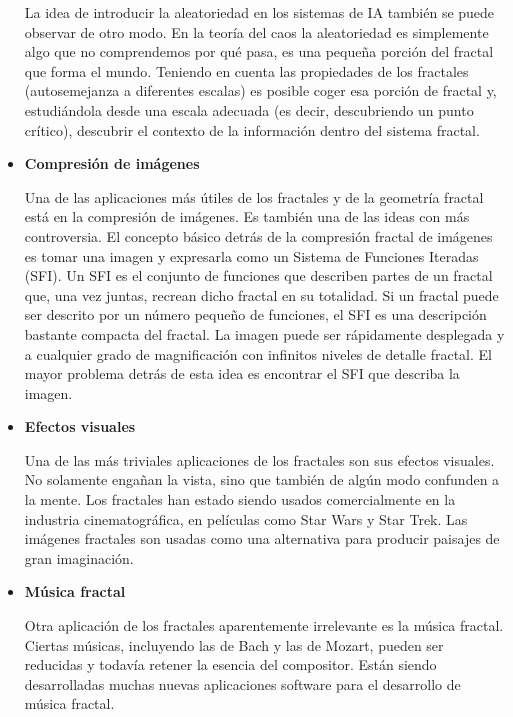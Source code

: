 \documentclass[letterpaper, 11pt, oneside]{article}
\theoremstyle{definition}
\theoremstyle{remark}
\begin{document}
\begin{itemize}
La idea de introducir la aleatoriedad en los sistemas de IA también se puede observar de otro modo. En la teoría del caos la aleatoriedad es simplemente algo que no comprendemos por qué pasa, es una pequeña porción del fractal que forma el mundo. Teniendo en cuenta las propiedades de los fractales (autosemejanza a diferentes escalas) es posible coger esa porción de fractal y, estudiándola desde una escala adecuada (es decir, descubriendo un punto crítico), descubrir el contexto de la información dentro del sistema fractal.

\item {\bf Compresión de imágenes \par}

Una de las aplicaciones más útiles de los fractales y de la geometría fractal está en la compresión de imágenes. Es también una de las ideas con más controversia. El concepto básico detrás de la compresión fractal de imágenes es tomar una imagen y expresarla como un Sistema de Funciones Iteradas (SFI). Un SFI es el conjunto de funciones que describen partes de un fractal que, una vez juntas, recrean dicho fractal en su totalidad. Si un fractal puede ser descrito por un número pequeño de funciones, el SFI es una descripción bastante compacta del fractal. La imagen puede ser rápidamente desplegada y a cualquier grado de magnificación con infinitos niveles de detalle fractal. El mayor problema detrás de esta idea es encontrar el SFI que describa la imagen. 

\item {\bf Efectos visuales \par}

Una de las más triviales aplicaciones de los fractales son sus efectos visuales. No solamente engañan la vista, sino que también de algún modo confunden a la mente. Los fractales han estado siendo usados comercialmente en la industria cinematográfica, en películas como Star Wars y Star Trek. Las imágenes fractales son usadas como una alternativa para producir paisajes de gran imaginación. 

\item {\bf Música fractal \par}

Otra aplicación de los fractales aparentemente irrelevante es la música fractal. Ciertas músicas, incluyendo las de Bach y las de Mozart, pueden ser reducidas y todavía retener la esencia del compositor. Están siendo desarrolladas muchas nuevas aplicaciones software para el desarrollo de música fractal.
\end{itemize}
\end{document}
